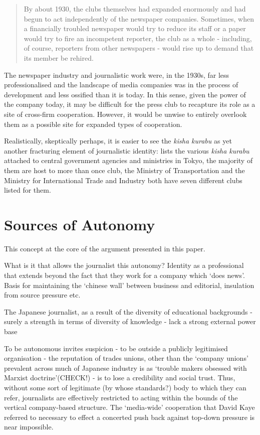 \documentclass[11pt, headings=normal]{scrartcl}
\begin{document}
\begin{quote}
By about 1930, the clubs themselves had expanded enormously and had
begun to act independently of the newspaper companies. Sometimes, when a
financially troubled newspaper would try to reduce its staff or a paper
would try to fire an incompetent reporter, the club as a whole -
including, of course, reporters from other newspapers - would rise up to
demand that its member be rehired. \autocite[ 386]{Yamamoto:1989}
\end{quote}

The newspaper industry and journalistic work were, in the 1930s, far
less professionalised and the landscape of media companies was in the
process of development and less ossified than it is today. In this
sense, given the power of the company today, it may be difficult for the
press club to recapture its role as a site of cross-firm cooperation.
However, it would be unwise to entirely overlook them as a possible site
for expanded types of cooperation.

Realistically, skeptically perhaps, it is easier to see the \emph{kisha
kurabu} as yet another fracturing element of journalistic identity:
\textcite[70--1]{Freeman:2000} lists the various \emph{kisha kurabu}
attached to central government agencies and ministries in Tokyo, the
majority of them are host to more than once club, the Ministry of
Transportation and the Ministry for International Trade and Industry
both have seven different clubs listed for them.

\hypertarget{sources-of-autonomy}{%
\section{Sources of Autonomy}\label{sources-of-autonomy}}

This concept at the core of the argument presented in this paper.

What is it that allows the journalist this autonomy? Identity as a
professional that extends beyond the fact that they work for a company
which `does news'. Basis for maintaining the `chinese wall' between
business and editorial, insulation from source pressure etc.

The Japanese journalist, as a result of the diversity of educational
backgrounds - surely a strength in terms of diversity of knowledge -
lack a strong external power base \autocite[212--3]{Soloski:1989}

To be autonomous invites suspicion - to be outside a publicly
legitimised organisation - the reputation of trades unions, other than
the `company unions' prevalent across much of Japanese industry is as
`trouble makers obsessed with Marxist doctrine'(CHECK!) - is to lose a
credibility and social trust. Thus, without some sort of legitimate (by
whose standards?) body to which they can refer, journalists are
effectively restricted to acting within the bounds of the vertical
company-based structure. The `media-wide' cooperation that David Kaye
referred to necessary to effect a concerted push back against top-down
pressure is near impossible.
\end{document}
